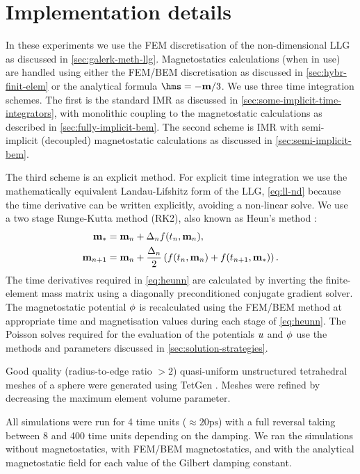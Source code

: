 \section{Implementation details}

In these experiments we use the FEM discretisation of the non-dimensional LLG as discussed in \cref{sec:galerk-meth-llg}.
Magnetostatics calculations (when in use) are handled using either the FEM/BEM discretisation as discussed in \cref{sec:hybr-finit-elem} or the analytical formula $\hms = -\mv/3$.
We use three time integration schemes.
The first is the standard IMR as discussed in \cref{sec:some-implicit-time-integrators}, with monolithic coupling to the magnetostatic calculations as described in \cref{sec:fully-implicit-bem}.
The second scheme is IMR with semi-implicit (decoupled) magnetostatic calculations as discussed in \cref{sec:semi-implicit-bem}.

The third scheme is an explicit method.
For explicit time integration we use the mathematically equivalent Landau-Lifshitz form of the LLG, \cref{eq:ll-nd} because the time derivative can be written explicitly, avoiding a non-linear solve.
We use a two stage Runge-Kutta method (RK2), also known as Heun's method \cite[58]{Atkinson2009}:
\begin{equation}
  \label{eq:heunn}
  \begin{aligned}
    \boldsymbol{\mathrm{m}}_* &= \boldsymbol{\mathrm{m}}_n + \Delta_{n} f(t_n, \boldsymbol{\mathrm{m}}_n), \\
    \boldsymbol{\mathrm{m}}_{n+1} &= \boldsymbol{\mathrm{m}}_n + \frac{\Delta_{n}}{2} \left( f(t_n, \boldsymbol{\mathrm{m}}_n) + f(t_{n+1},
      \boldsymbol{\mathrm{m}}_*) \right).
  \end{aligned}
\end{equation}
The time derivatives required in \cref{eq:heunn} are calculated by inverting the finite-element mass matrix using a diagonally preconditioned conjugate gradient solver.
The magnetostatic potential $\phi$ is recalculated using the FEM/BEM method at appropriate time and magnetisation values during each stage of \cref{eq:heunn}.
The Poisson solves required for the evaluation of the potentials $u$ and $\phi$ use the methods and parameters discussed in \cref{sec:solution-strategies}.



Good quality (radius-to-edge ratio $ > 2$) quasi-uniform unstructured tetrahedral meshes of a sphere were generated using TetGen \cite{tetgen-website}.
Meshes were refined by decreasing the maximum element volume parameter.

All simulations were run for 4 time units ($\approx 20\text{ps}$) with a full reversal taking between 8 and 400 time units depending on the damping.
We ran the simulations without magnetostatics, with FEM/BEM magnetostatics, and with the analytical magnetostatic field for each value of the Gilbert damping constant.

